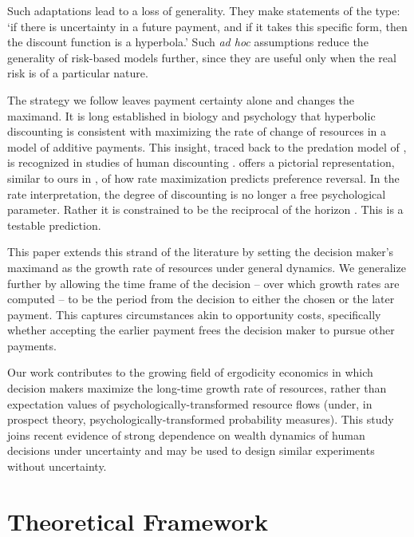 Such adaptations lead to a loss of generality. They make statements of the type: `if there is uncertainty in a future payment, and if it takes this specific form, then the discount function is a hyperbola.' Such {\it ad hoc} assumptions reduce the generality of risk-based models further, since they are useful only when the real risk is of a particular nature.

The strategy we follow leaves payment certainty alone and changes the maximand. It is long established in biology and psychology that hyperbolic discounting is consistent with maximizing the rate of change of resources in a model of additive payments. This insight, traced back to the predation model of \citet{Holling1959}, is recognized in studies of human discounting \citep{MyersonGreen1995,Kacelnik1997,Sozou1998}. \citet[Fig.~2]{Kacelnik1997} offers a pictorial representation, similar to ours in , of how rate maximization predicts preference reversal. In the rate interpretation, the degree of discounting is no longer a free psychological parameter. Rather it is constrained to be the reciprocal of the horizon \citep{MyersonGreen1995}. This is a testable prediction.

This paper extends this strand of the literature by setting the decision maker's maximand as the growth rate of resources under general dynamics. We generalize further by allowing the time frame of the decision -- over which growth rates are computed -- to be the period from the decision to either the chosen or the later payment. This captures circumstances akin to opportunity costs, specifically whether accepting the earlier payment frees the decision maker to pursue other payments.

Our work contributes to the growing field of ergodicity economics \citep{PetersGell-Mann2016,BermanPetersAdamou2017,PetersAdamou2018a} in which decision makers maximize the long-time growth rate of resources, rather than expectation values of psychologically-transformed resource flows (under, in prospect theory, psychologically-transformed probability measures). This study joins recent evidence of strong dependence on wealth dynamics of human decisions under uncertainty \citep{MederETAL2019} and may be used to design similar experiments without uncertainty.

\section{Theoretical Framework}\label{sec:model}

